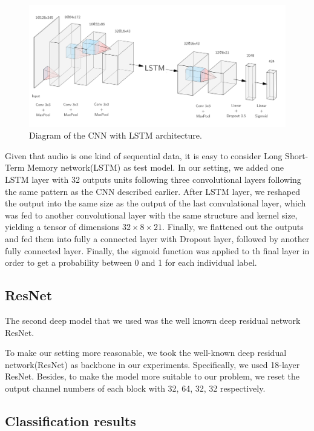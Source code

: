 \documentclass{article}
\begin{document}
\begin{figure}
\includegraphics[scale=0.45]{CNN_LSTM_diagram.png}
\caption{Diagram of the CNN with LSTM architecture. \label{cnn_lstm}}
\end{figure}

Given that audio is one kind of sequential data, it is easy to consider Long Short-Term Memory network(LSTM) as test model. In our setting, we added one LSTM layer with 32 outputs units following three convolutional layers following the same pattern as the CNN described earlier. After LSTM layer, we reshaped the output into the same size as the output of the last convulational layer, which was fed to another convolutional layer with the same structure and kernel size, yielding a tensor of dimensions $32\times 8 \times 21$. Finally, we flattened out the outputs and fed them into fully a connected layer with Dropout layer, followed by another fully connected layer. Finally, the sigmoid function was applied to th final layer in order to get a probability between 0 and 1 for each individual label.\\


\subsection{ResNet}

The second deep model that we used was the well known deep residual network ResNet.

To make our setting more reasonable, we took the well-known deep residual network(ResNet) as backbone in our experiments. Specifically, we used 18-layer ResNet. Besides, to make the model more suitable to our problem, we reset the output channel numbers of each block with 32, 64, 32, 32 respectively. 

\subsection{Classification results}
\end{document}

